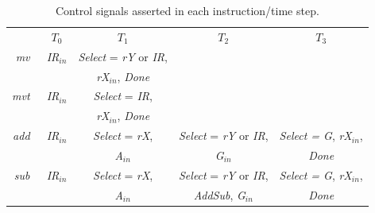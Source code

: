 \documentclass[epsfig,10pt,fullpage]{article}
\begin{document}
\begin{table}[H]
\begin{center}
\begin{tabular}{r|c|c|c|c|}
\multicolumn{1}{c}{~} & \multicolumn{1}{c}{$T_0$} & \multicolumn{1}{c}{$T_1$} & \multicolumn{1}{c}{$T_2$} & \multicolumn{1}{c}{$T_3$} \rule[-0.075in]{0in}{0.25in}\\ \cline{2-5}
{\it mv~} & {\it IR}$_{in}$ & \rule[-0.075in]{0in}{0.25in}{\it Select} = {\it rY} or {\it IR}, &  &  \\
~ & ~ & {\it rX$_{in}$}, {\it Done} &  &  \\ \cline{2-5}
{\it mvt~} & {\it IR}$_{in}$ & \rule[-0.075in]{0in}{0.25in}{\it Select} = {\it IR}, &  &  \\
~ & ~ & {\it rX$_{in}$}, {\it Done} &  &  \\ \cline{2-5}
\rule[-0.075in]{0in}{0.25in}{\it add~} & {\it IR}$_{in}$ & {\it Select} = {\it rX}, & {\it Select} = {\it rY} or {\it IR}, & {\it Select = G}, {\it rX$_{in}$}, \\
~ & ~ & {\it A$_{in}$} &  {\it G$_{in}$} & {\it Done} \\
\cline{2-5}
\rule[-0.075in]{0in}{0.25in}{\it sub~} & {\it IR}$_{in}$ & {\it Select} = {\it rX}, & {\it Select} = {\it rY} or {\it IR}, & {\it Select = G}, {\it rX$_{in}$}, \\
~ & ~ & {\it A$_{in}$} &  {\it AddSub}, {\it G$_{in}$} & {\it Done} \\
\cline{2-5}
\end{tabular}
\caption{Control signals asserted in each instruction/time step.}
\label{tab:control_signals}
\end{center}
\end{table}
\end{document}
